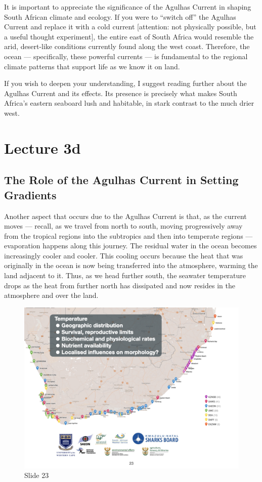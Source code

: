\documentclass[
  10pt,
]{book}
\begin{document}
It is important to appreciate the significance of the Agulhas Current in
shaping South African climate and ecology. If you were to ``switch off''
the Agulhas Current and replace it with a cold current {[}attention: not
physically possible, but a useful thought experiment{]}, the entire east
of South Africa would resemble the arid, desert-like conditions
currently found along the west coast. Therefore, the ocean ---
specifically, these powerful currents --- is fundamental to the regional
climate patterns that support life as we know it on land.

If you wish to deepen your understanding, I suggest reading further
about the Agulhas Current and its effects. Its presence is precisely
what makes South Africa's eastern seaboard lush and habitable, in stark
contrast to the much drier west.

\chapter*{Lecture 3d}\label{lecture-3d}

\section{The Role of the Agulhas Current in Setting
Gradients}\label{the-role-of-the-agulhas-current-in-setting-gradients}

Another aspect that occurs due to the Agulhas Current is that, as the
current moves --- recall, as we travel from north to south, moving
progressively away from the tropical regions into the subtropics and
then into temperate regions --- evaporation happens along this journey.
The residual water in the ocean becomes increasingly cooler and cooler.
This cooling occurs because the heat that was originally in the ocean is
now being transferred into the atmosphere, warming the land adjacent to
it. Thus, as we head further south, the seawater temperature drops as
the heat from further north has dissipated and now resides in the
atmosphere and over the land.

\begin{figure}[ht]
\centering
\includegraphics[width=0.8\linewidth]{../images/BDC334/BDC334-023.jpeg}
\caption*{Slide 23}
\end{figure}
\end{document}
